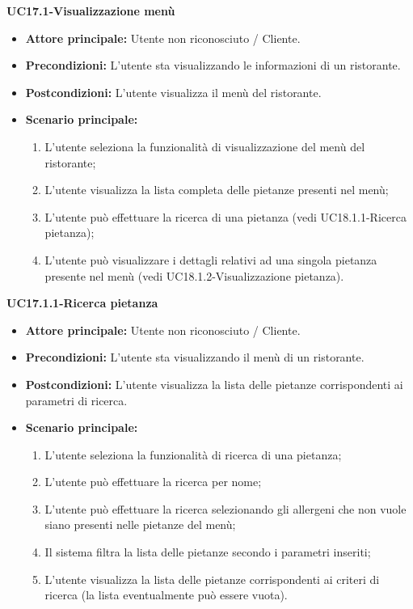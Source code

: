 \textbf{UC17.1-Visualizzazione menù}
\begin{itemize}
\item \textbf{Attore principale:} Utente non riconosciuto / Cliente.
\item \textbf{Precondizioni:} L'utente sta visualizzando le informazioni di un ristorante.
\item \textbf{Postcondizioni:} L'utente visualizza il menù del ristorante.
\item \textbf{Scenario principale:}
\begin{enumerate}
    \item L'utente seleziona la funzionalità di visualizzazione del menù del ristorante;
    \item L'utente visualizza la lista completa delle pietanze presenti nel menù;
    \item L'utente può effettuare la ricerca di una pietanza (vedi UC18.1.1-Ricerca pietanza);
    \item L'utente può visualizzare i dettagli relativi ad una singola pietanza presente
     nel menù (vedi UC18.1.2-Visualizzazione pietanza).
\end{enumerate}
\end{itemize}

\textbf{UC17.1.1-Ricerca pietanza}
\begin{itemize}
\item \textbf{Attore principale:} Utente non riconosciuto / Cliente.
\item \textbf{Precondizioni:} L'utente sta visualizzando il menù di un ristorante.
\item \textbf{Postcondizioni:} L'utente visualizza la lista delle pietanze corrispondenti ai parametri di ricerca.
\item \textbf{Scenario principale:}
\begin{enumerate}
    \item L'utente seleziona la funzionalità di ricerca di una pietanza;
    \item L'utente può effettuare la ricerca per nome;
    \item L'utente può effettuare la ricerca selezionando gli allergeni che non vuole
    siano presenti nelle pietanze del menù;
    \item Il sistema filtra la lista delle pietanze secondo i parametri inseriti;
    \item L'utente visualizza la lista delle pietanze corrispondenti ai criteri di ricerca
    (la lista eventualmente può essere vuota).
\end{enumerate}
\end{itemize}


